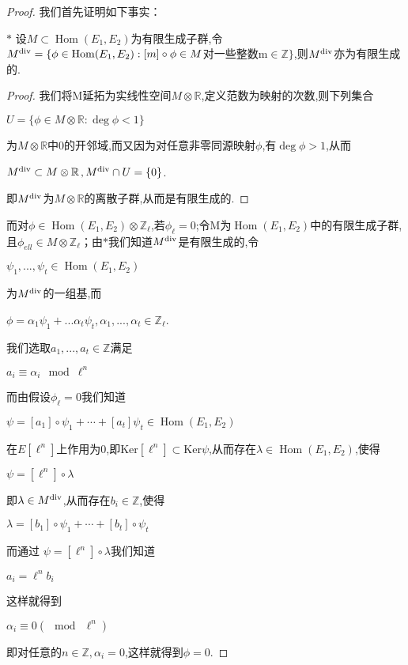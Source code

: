\documentclass[11pt]{ctexart}
\DeclareMathOperator{\Hom}{Hom}
\DeclareMathOperator{\Deg}{deg}
\begin{document}
\begin{proof}我们首先证明如下事实：

$\ast$ 设$M\subset \Hom(E_1,E_2)$为有限生成子群,令$M^{\textup{div}}=\{\phi \in \Hom(E_1,E_2):[m]\circ \phi \in M$对一些整数m$\in \mathbb{Z} \}$,则$M^{\textup{div}}$亦为有限生成的.
\begin{proof}
    我们将M延拓为实线性空间$M\otimes \mathbb{R}$,定义范数为映射的次数,则下列集合
\begin{center}
    $U=\{\phi \in M\otimes \mathbb{R}:\Deg\phi  < 1\}$
\end{center}
\noindent 为$M\otimes \mathbb{R}$中0的开邻域,而又因为对任意非零同源映射$\phi$,有$\Deg\phi>1$,从而
\begin{center}
    $M^{\textup{div}}\subset M\otimes \mathbb{R}$$,M^{\textup{div}}\cap U =\{0\} $.
\end{center}
\noindent 即$M^{\textup{div}}$为$M\otimes \mathbb{R}$的离散子群,从而是有限生成的.

\end{proof}
而对$\phi \in \Hom(E_1,E_2)\otimes \mathbb{Z}_{\ell}$,若$\phi_{\ell}=0$;令M为$\Hom(E_1,E_2)$中的有限生成子群,且$\phi_{ell}\in M\otimes \mathbb{Z}_{\ell}$；由$\ast $我们知道$M^{\textup{div}}$是有限生成的,令
\begin{center}
    $\psi_1,...,\psi_t \in \Hom(E_1,E_2)$
\end{center}
\noindent 为$M^{\textup{div}}$的一组基,而
\begin{center}
    $\phi=\alpha_1\psi_1+...\alpha_t\psi_t$$,\alpha_1,...,\alpha_t \in \mathbb{Z}_{\ell}$.
\end{center}
\noindent 我们选取$a_1,...,a_t \in \mathbb{Z}$满足
\begin{center}
    $ a_i \equiv \alpha_i \mod\ell^n$
\end{center}
\noindent 而由假设$\phi_{\ell}=0$我们知道
\begin{center}
    $\psi = [a_1]\circ\psi_1+\cdots+[a_t]\psi_t \in \Hom(E_1,E_2) $
\end{center}
\noindent 在$E[\ell^n]$上作用为0,即Ker$[\ell^n] \subset $Ker$\psi$,从而存在$\lambda \in \Hom(E_1,E_2)$,使得
\begin{center}
    $\psi =[\ell^n]\circ \lambda$
\end{center}
\noindent 即$\lambda \in M^{\textup{div}}$,从而存在$b_i \in \mathbb{Z}$,使得
\begin{center}
    $\lambda =[b_1]\circ \psi_1+\cdots+[b_t]\circ\psi_t$
\end{center}
\noindent 而通过 $\psi =[\ell^n]\circ \lambda$我们知道
\begin{center}
    $a_i=\ell^nb_i$
\end{center}
\noindent 这样就得到
\begin{center}
    $\alpha_i \equiv 0(\mod ~\ell^n)$
\end{center}
\noindent 即对任意的$n\in \mathbb{Z}$$,\alpha_i=0$,这样就得到$\phi=0$.
\end{proof}
\end{document}
